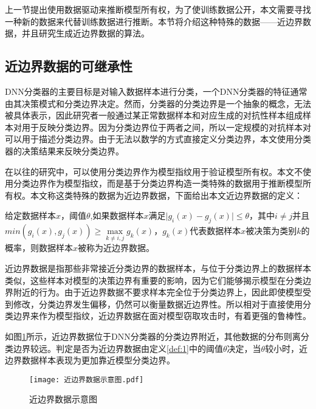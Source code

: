上一节提出使用数据驱动来推断模型所有权，为了使训练数据公开，本文需要寻找一种新的数据来代替训练数据进行推断。本节将介绍这种特殊的数据——近边界数据，并且研究生成近边界数据的算法。

\subsection{近边界数据的可继承性}

DNN分类器的主要目标是对输入数据样本进行分类，一个DNN分类器的特征通常由其决策模式和分类边界决定。然而，分类器的分类边界是一个抽象的概念，无法被具体表示，因此研究者一般通过某正常数据样本和对应生成的对抗性样本组成样本对用于反映分类边界。因为分类边界位于两者之间，所以一定规模的对抗样本对可以用于描述分类边界。由于无法以数学的方式直接定义分类边界，本文使用分类器的决策结果来反映分类边界。

在以往的研究中\cite{cao2021ipguard}，可以使用分类边界作为模型指纹用于验证模型所有权。本文不使用分类边界作为模型指纹，而是基于分类边界构造一类特殊的数据用于推断模型所有权。本文称这类特殊的数据为近边界数据，下面给出本文近边界数据的定义：

\begin{Definition}[近边界数据]
	\label{def:1}
	给定数据样本$x$，阈值$\theta$,如果数据样本$x$满足$\vert g_i(x) - g_j(x) \vert \leq \theta$，其中$i \neq j $并且$min(g_i(x), g_j(x)) \geq \mathop{max} \limits_{k \neq i, j}g_k(x)$，$g_k(x)$代表数据样本$x$被决策为类别$k$的概率，则数据样本$x$被称为近边界数据。
\end{Definition}

近边界数据是指那些非常接近分类边界的数据样本，与位于分类边界上的数据样本类似，这些样本对模型的决策边界有重要的影响，因为它们能够揭示模型在分类边界附近的行为。由于近边界数据不要求样本完全位于分类边界上，因此即使模型受到修改，分类边界发生偏移，仍然可以衡量数据近边界性。所以相对于直接使用分类边界来作为模型指纹，近边界数据在面对模型窃取攻击时，有着更强的鲁棒性。

如图\ref{近边界数据示意图}所示，近边界数据位于DNN分类器的分类边界附近，其他数据的分布则离分类边界较远。判定是否为近边界数据由定义\ref{def:1}中的阈值$\theta$决定，当$\theta$较小时，近边界数据样本表现为更加靠近模型分类边界。

\begin{figure}[htbp]%
	\centering
	\setlength{\abovecaptionskip}{5mm} %
	\setlength{\belowcaptionskip}{-3mm} %
	\texttt{[image: 近边界数据示意图.pdf]}
	\caption{近边界数据示意图}
	\label{近边界数据示意图}
	\end {figure}
	
